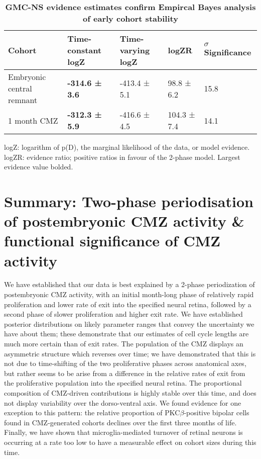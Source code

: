 \begin{table}[!ht]
    \centering
    \caption{{\bf GMC-NS evidence estimates confirm Empircal Bayes analysis of early cohort stability}}
    \begin{tabular}{|l|l|l|l|l|} \hline 
        {\bf Cohort} & {\bf Time-constant logZ} & {\bf Time-varying logZ} & {\bf logZR} & {\bf $\sigma$ Significance}\\ \hline
        Embryonic central remnant & {\bf -314.6 ± 3.6} & -413.4 ± 5.1 & 98.8 ± 6.2 & 15.8\\ \hline
        1 month CMZ & {\bf -312.3 ± 5.9} & -416.6 ± 4.5 & 104.3 ± 7.4 & 14.1\\ \hline
    \end{tabular}
    \begin{flushleft} logZ: logarithm of p(D), the marginal likelihood of the data, or model evidence. logZR: evidence ratio; positive ratios in favour of the 2-phase model. Largest evidence value bolded.
    \end{flushleft}
    \label{turnoverGMCtable}
\end{table}

\section{Summary: Two-phase periodisation of postembryonic CMZ activity \& functional significance of CMZ activity}
We have established that our data is best explained by a 2-phase periodization of postembryonic CMZ activity, with an initial month-long phase of relatively rapid proliferation and lower rate of exit into the specified neural retina, followed by a second phase of slower proliferation and higher exit rate. We have established posterior distributions on likely parameter ranges that convey the uncertainty we have about them; these demonstrate that our estimates of cell cycle lengths are much more certain than of exit rates.  The population of the CMZ displays an asymmetric structure which reverses over time; we have demonstrated that this is not due to time-shifting of the two proliferative phases across anatomical axes, but rather seems to be arise from a difference in the relative rates of exit from the proliferative population into the specified neural retina. The proportional composition of CMZ-driven contributions is highly stable over this time, and does not display variability over the dorso-ventral axis. We found evidence for one exception to this pattern: the relative proportion of PKC$\beta$-positive bipolar cells found in CMZ-generated cohorts declines over the first three months of life. Finally, we have shown that microglia-mediated turnover of retinal neurons is occurring at a rate too low to have a measurable effect on cohort sizes during this time.

